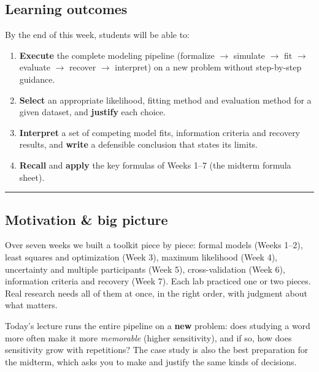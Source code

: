 \subsection{Learning outcomes}

By the end of this week, students will be able to:

\begin{enumerate}
\def\labelenumi{\arabic{enumi}.}
\tightlist
\item
  \textbf{Execute} the complete modeling pipeline (formalize \ensuremath{\rightarrow} simulate
  \ensuremath{\rightarrow} fit \ensuremath{\rightarrow} evaluate \ensuremath{\rightarrow} recover \ensuremath{\rightarrow} interpret) on a new problem without
  step-by-step guidance.
\item
  \textbf{Select} an appropriate likelihood, fitting method and
  evaluation method for a given dataset, and \textbf{justify} each
  choice.
\item
  \textbf{Interpret} a set of competing model fits, information criteria
  and recovery results, and \textbf{write} a defensible conclusion that
  states its limits.
\item
  \textbf{Recall} and \textbf{apply} the key formulas of Weeks 1--7 (the
  midterm formula sheet).
\end{enumerate}

\begin{center}\rule{0.5\linewidth}{0.5pt}\end{center}

\subsection{Motivation \& big picture}

Over seven weeks we built a toolkit piece by piece: formal models (Weeks
1--2), least squares and optimization (Week 3), maximum likelihood (Week
4), uncertainty and multiple participants (Week 5), cross-validation
(Week 6), information criteria and recovery (Week 7). Each lab practiced
one or two pieces. Real research needs all of them at once, in the right
order, with judgment about what matters.

Today's lecture runs the entire pipeline on a \textbf{new} problem: does
studying a word more often make it more \emph{memorable} (higher
sensitivity), and if so, how does sensitivity grow with repetitions? The
case study is also the best preparation for the midterm, which asks you
to make and justify the same kinds of decisions.

